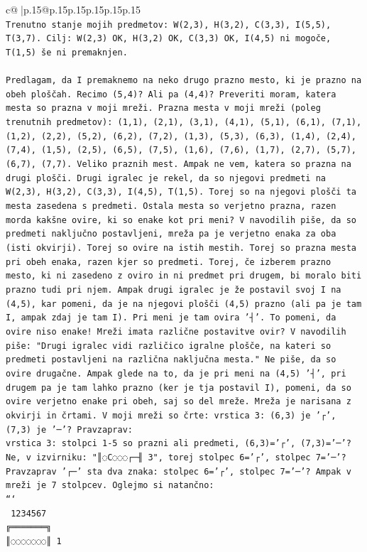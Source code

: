 \documentclass{article}
\begin{document}
{\begin{supertabular}{c@{$\;$}|p{.15\linewidth}@{}p{.15\linewidth}p{.15\linewidth}p{.15\linewidth}p{.15\linewidth}p{.15\linewidth}}
{{{\\ 
\texttt{Trenutno stanje mojih predmetov: W(2,3), H(3,2), C(3,3), I(5,5), T(3,7). Cilj: W(2,3) OK, H(3,2) OK, C(3,3) OK, I(4,5) ni mogoče, T(1,5) še ni premaknjen.} \\
\\ 
\texttt{Predlagam, da I premaknemo na neko drugo prazno mesto, ki je prazno na obeh ploščah. Recimo (5,4)? Ali pa (4,4)? Preveriti moram, katera mesta so prazna v moji mreži. Prazna mesta v moji mreži (poleg trenutnih predmetov): (1,1), (2,1), (3,1), (4,1), (5,1), (6,1), (7,1), (1,2), (2,2), (5,2), (6,2), (7,2), (1,3), (5,3), (6,3), (1,4), (2,4), (7,4), (1,5), (2,5), (6,5), (7,5), (1,6), (7,6), (1,7), (2,7), (5,7), (6,7), (7,7). Veliko praznih mest. Ampak ne vem, katera so prazna na drugi plošči. Drugi igralec je rekel, da so njegovi predmeti na W(2,3), H(3,2), C(3,3), I(4,5), T(1,5). Torej so na njegovi plošči ta mesta zasedena s predmeti. Ostala mesta so verjetno prazna, razen morda kakšne ovire, ki so enake kot pri meni? V navodilih piše, da so predmeti naključno postavljeni, mreža pa je verjetno enaka za oba (isti okvirji). Torej so ovire na istih mestih. Torej so prazna mesta pri obeh enaka, razen kjer so predmeti. Torej, če izberem prazno mesto, ki ni zasedeno z oviro in ni predmet pri drugem, bi moralo biti prazno tudi pri njem. Ampak drugi igralec je že postavil svoj I na (4,5), kar pomeni, da je na njegovi plošči (4,5) prazno (ali pa je tam I, ampak zdaj je tam I). Pri meni je tam ovira '┤'. To pomeni, da ovire niso enake! Mreži imata različne postavitve ovir? V navodilih piše: "Drugi igralec vidi različico igralne plošče, na kateri so predmeti postavljeni na različna naključna mesta." Ne piše, da so ovire drugačne. Ampak glede na to, da je pri meni na (4,5) '┤', pri drugem pa je tam lahko prazno (ker je tja postavil I), pomeni, da so ovire verjetno enake pri obeh, saj so del mreže. Mreža je narisana z okvirji in črtami. V moji mreži so črte: vrstica 3: (6,3) je '┌', (7,3) je '─'? Pravzaprav:} \\
\texttt{vrstica 3: stolpci 1{-}5 so prazni ali predmeti, (6,3)='┌', (7,3)='─'? Ne, v izvirniku: "║◌C◌◌◌┌─╢ 3", torej stolpec 6='┌', stolpec 7='─'? Pravzaprav '┌─' sta dva znaka: stolpec 6='┌', stolpec 7='─'? Ampak v mreži je 7 stolpcev. Oglejmo si natančno:} \\
\texttt{```} \\
\texttt{ 1234567} \\
\texttt{╔═══════╗} \\
\texttt{║◌◌◌◌◌◌◌║ 1} \\
}}}
\end{supertabular}}
\end{document}
